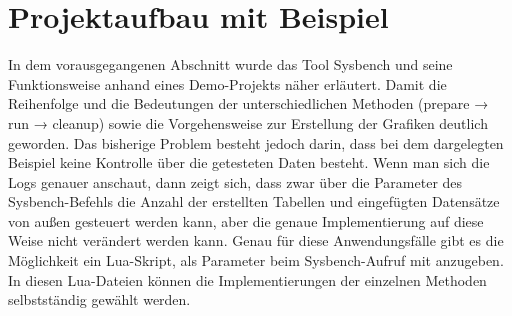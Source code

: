 
\section{Projektaufbau mit Beispiel}\label{sec:projektaufbau-mit-beispiel}

In dem vorausgegangenen Abschnitt wurde das Tool Sysbench und seine Funktionsweise anhand eines Demo-Projekts näher erläutert.
Damit die Reihenfolge und die Bedeutungen der unterschiedlichen Methoden (prepare → run → cleanup) sowie die Vorgehensweise zur Erstellung der Grafiken deutlich geworden.
Das bisherige Problem besteht jedoch darin, dass bei dem dargelegten Beispiel keine Kontrolle über die getesteten Daten besteht.
Wenn man sich die Logs genauer anschaut, dann zeigt sich, dass zwar über die Parameter des Sysbench-Befehls die Anzahl der erstellten Tabellen und eingefügten Datensätze von außen gesteuert werden kann, aber die genaue Implementierung auf diese Weise nicht verändert werden kann.
Genau für diese Anwendungsfälle gibt es die Möglichkeit ein Lua-Skript, als Parameter beim Sysbench-Aufruf mit anzugeben.
In diesen Lua-Dateien können die Implementierungen der einzelnen Methoden selbstständig gewählt werden.

